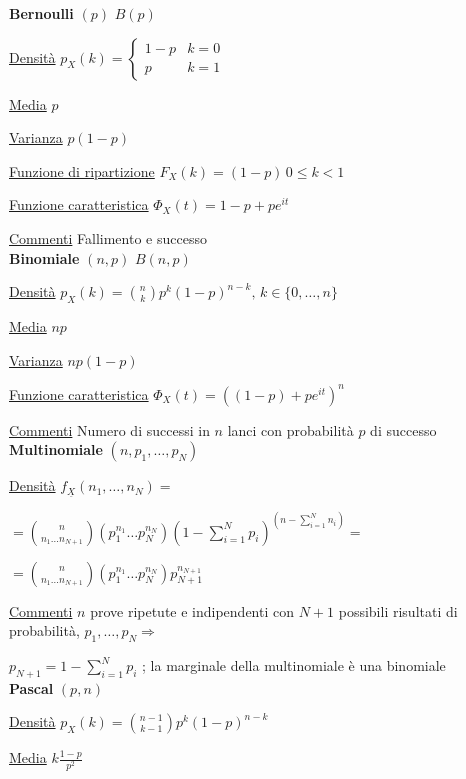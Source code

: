 \documentclass[openany]{book} %
\begin{document}
\begin{multicols}{2}

	\textbf{Bernoulli} $(p)$ \quad $B(p)$

	\underline{Densità} $p_X(k) = \begin {cases}1-p & k =0\\ p & k=1\end {cases}$

	\underline{Media} $p$

	\underline{Varianza} $p(1-p)$

	\underline{Funzione di ripartizione} $F_X(k)=(1-p)\, 0\leq k <1 $

	\underline{Funzione caratteristica} $\Phi_X(t)= 1-p+pe^{it}$

	\underline{Commenti} Fallimento e successo
	\\

	\textbf{Binomiale} $(n,p)$ \quad $B(n,p)$

	\underline{Densità} $p_X(k) = \binom {n}{k}p^k(1-p)^{n-k},\,k \in \{0,\dots,n\}$

	\underline{Media} $np$

	\underline{Varianza} $np(1-p)$

	\underline{Funzione caratteristica} $\Phi_X(t)=((1-p)+pe^{it})^n$

	\underline{Commenti} Numero di successi in $n$ lanci con probabilità $p$ di successo
	\\

	\textbf{Multinomiale} $(n,p_1,\dots,p_N)$

	\underline{Densità} $f_{\underline {X}}(n_1,\dots,n_N)=$

	$=\binom {n}{n_1 \dots n_{N+1}}\left(p_1^{n_1}\dots p_N^{n_N}\right)\left(1-\sum_{i=1}^N p_i\right)^{\left(n-\sum_{i=1}^N n_i\right)}=$

	$=\binom {n}{n_1 \dots n_{N+1}}\left(p_1^{n_1}\dots p_N^{n_N}\right)p_{N+1}^{n_{N+1}}$

	\underline{Commenti} $n$ prove ripetute e indipendenti con $N+1$ possibili risultati di probabilità, \quad $p_1,\dots,p_N \Rightarrow$

	$p_{N+1}=1-\sum_{i=1}^Np_i$ ; la marginale della multinomiale è una binomiale
	\\

	\textbf{Pascal} $(p,n)$

	\underline{Densità} $p_X(k) = \binom {n-1}{k-1}p^k(1-p)^{n-k}$

	\underline{Media} $k\frac{1-p}{p^2}$


\end{multicols}
\end{document}
